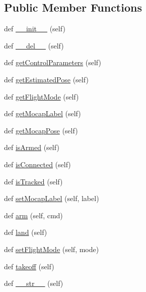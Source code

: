 \subsection*{Public Member Functions}
\begin{DoxyCompactItemize}
\item 
def \mbox{\hyperlink{classwindshape_1_1drone_1_1_drone_1_1_drone_ae2c508fe84e2be14bbf31812711cdfd6}{\+\_\+\+\_\+init\+\_\+\+\_\+}} (self)
\item 
def \mbox{\hyperlink{classwindshape_1_1drone_1_1_drone_1_1_drone_a1ab69c6c179d0dcab1694c42f023cb37}{\+\_\+\+\_\+del\+\_\+\+\_\+}} (self)
\item 
def \mbox{\hyperlink{classwindshape_1_1drone_1_1_drone_1_1_drone_a255d2634547c1cd613108951b968ed6f}{get\+Control\+Parameters}} (self)
\item 
def \mbox{\hyperlink{classwindshape_1_1drone_1_1_drone_1_1_drone_ab4435f13cb1e062137c822f7b0be778a}{get\+Estimated\+Pose}} (self)
\item 
def \mbox{\hyperlink{classwindshape_1_1drone_1_1_drone_1_1_drone_a05934a953a52558fd19b18435c52cc40}{get\+Flight\+Mode}} (self)
\item 
def \mbox{\hyperlink{classwindshape_1_1drone_1_1_drone_1_1_drone_ac29dae974ab7bb13d250dbb752e20853}{get\+Mocap\+Label}} (self)
\item 
def \mbox{\hyperlink{classwindshape_1_1drone_1_1_drone_1_1_drone_aff00e3bde6aa9347331f92135644edd2}{get\+Mocap\+Pose}} (self)
\item 
def \mbox{\hyperlink{classwindshape_1_1drone_1_1_drone_1_1_drone_a161d7774319e5de5dd7f13f5c66b64a3}{is\+Armed}} (self)
\item 
def \mbox{\hyperlink{classwindshape_1_1drone_1_1_drone_1_1_drone_a0d6c9c56fd735733f4a2268896c30d37}{is\+Connected}} (self)
\item 
def \mbox{\hyperlink{classwindshape_1_1drone_1_1_drone_1_1_drone_a8e5d50aa9df5f17650570e60ac809477}{is\+Tracked}} (self)
\item 
def \mbox{\hyperlink{classwindshape_1_1drone_1_1_drone_1_1_drone_a56218cb96a8907668ec8137085fb41e7}{set\+Mocap\+Label}} (self, label)
\item 
def \mbox{\hyperlink{classwindshape_1_1drone_1_1_drone_1_1_drone_a7418f92ab851d2707ac067fbec4cc8cd}{arm}} (self, cmd)
\item 
def \mbox{\hyperlink{classwindshape_1_1drone_1_1_drone_1_1_drone_ab98bca80eada4b3365774f3cc347ea9b}{land}} (self)
\item 
def \mbox{\hyperlink{classwindshape_1_1drone_1_1_drone_1_1_drone_a728b7ccd51bc67e1338652940f24caac}{set\+Flight\+Mode}} (self, mode)
\item 
def \mbox{\hyperlink{classwindshape_1_1drone_1_1_drone_1_1_drone_a76ec9fc58bfe4b6ddb8ab5739bfdd2ea}{takeoff}} (self)
\item 
def \mbox{\hyperlink{classwindshape_1_1drone_1_1_drone_1_1_drone_a6c7c3a3cc6a63aec8e624febc3a40e67}{\+\_\+\+\_\+str\+\_\+\+\_\+}} (self)
\end{DoxyCompactItemize}
